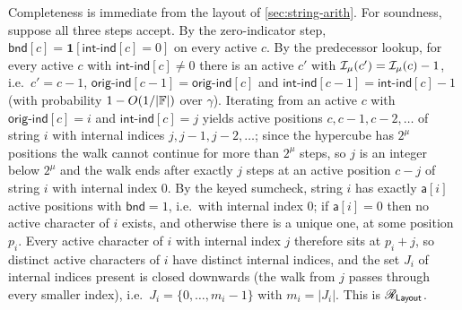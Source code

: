 Completeness is immediate from the layout of \cref{sec:string-arith}. For soundness, suppose all three steps accept. By the zero-indicator step, $\mathsf{bnd}[c] = \mathbf{1}[\mathsf{int\text{-}ind}[c] = 0]$ on every active $c$. By the predecessor lookup, for every active $c$ with $\mathsf{int\text{-}ind}[c] \ne 0$ there is an active $c'$ with $\mathcal{I}_\mu(c') = \mathcal{I}_\mu(c) - 1$, i.e.\ $c' = c - 1$, $\mathsf{orig\text{-}ind}[c-1] = \mathsf{orig\text{-}ind}[c]$ and $\mathsf{int\text{-}ind}[c-1] = \mathsf{int\text{-}ind}[c] - 1$ (with probability $1 - O(1/|\mathbb{F}|)$ over $\gamma$). Iterating from an active $c$ with $\mathsf{orig\text{-}ind}[c] = i$ and $\mathsf{int\text{-}ind}[c] = j$ yields active positions $c, c-1, c-2, \dots$ of string $i$ with internal indices $j, j-1, j-2, \dots$; since the hypercube has $2^\mu$ positions the walk cannot continue for more than $2^\mu$ steps, so $j$ is an integer below $2^\mu$ and the walk ends after exactly $j$ steps at an active position $c - j$ of string $i$ with internal index $0$. By the keyed sumcheck, string $i$ has exactly $\mathsf{a}[i]$ active positions with $\mathsf{bnd} = 1$, i.e.\ with internal index $0$; if $\mathsf{a}[i] = 0$ then no active character of $i$ exists, and otherwise there is a unique one, at some position $p_i$. Every active character of $i$ with internal index $j$ therefore sits at $p_i + j$, so distinct active characters of $i$ have distinct internal indices, and the set $J_i$ of internal indices present is closed downwards (the walk from $j$ passes through every smaller index), i.e.\ $J_i = \{0, \dots, m_i - 1\}$ with $m_i = |J_i|$. This is $\mathscr{R}_{\mathsf{Layout}}$.

